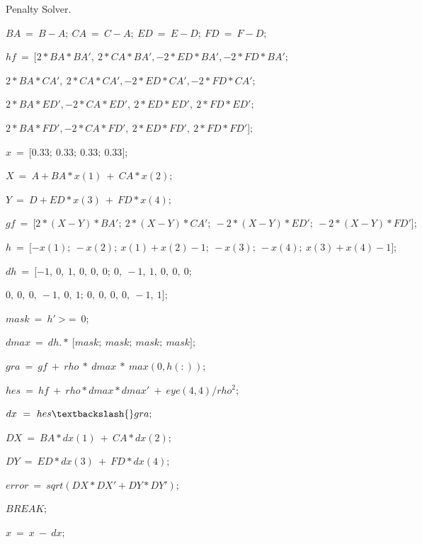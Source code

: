 \begin{algorithm}
	\protect\caption{\label{alg4}Penalty Solver.}
	\begin{algorithmic}[1]
	

		\State $BA~=~B-A;~CA~=~C-A;~ED~=~E-D;~FD~=~F-D;$

		\State $hf~=~{[}2{*}BA{*}BA',~2{*}CA{*}BA',-2{*}ED{*}BA',-2{*}FD{*}BA';$

		\State $2{*}BA{*}CA',~2{*}CA{*}CA',-2{*}ED{*}CA',-2{*}FD{*}CA';$

		\State $2{*}BA{*}ED',-2{*}CA{*}ED',~2{*}ED{*}ED',~2{*}FD{*}ED';$

		\State $2{*}BA{*}FD',-2{*}CA{*}FD',~2{*}ED{*}FD',~2{*}FD{*}FD'{]};$

		\State $x~=~{[}0.33;~0.33;~0.33;~0.33{]};$


			\State $X~=~A+BA{*}x(1)~+~CA{*}x(2);$

			\State $Y~=~D+ED{*}x(3)~+~FD{*}x(4);$

			\State $gf~=~{[}2{*}(X-Y){*}BA';~2{*}(X-Y){*}CA';~-2{*}(X-Y){*}ED';~-2{*}(X-Y){*}FD'{]};$

			\State $h~=~{[}-x(1);~-x(2);~x(1)+x(2)-1;~-x(3);~-x(4);~x(3)+x(4)-1{]};$

			\State $dh~=~{[}-1,~0,~1,~0,~0,~0;~0,~-1,~1,~0,~0,~0;$

			\State $0,~0,~0,~-1,~0,~1;~0,~0,~0,~0,~-1,~1{]};$

			\State $mask~=~h'~$>$=~0;$

			\State $dmax~=~dh.{*}~{[}mask;~mask;~mask;~mask{]};$

			\State $gra~=~gf~+~rho~{*}~dmax~{*}~max(0,h(:));$

			\State $hes~=~hf~+~rho{*}dmax{*}dmax'~+~eye(4,4)/rho^2;$

			\State $dx~=~hes\textbackslash{}gra;$

			\State $DX~=~BA{*}dx(1)~+~CA{*}dx(2);$

			\State $DY~=~ED{*}dx(3)~+~FD{*}dx(4);$

			\State $error~=~sqrt(DX{*}DX'+DY{*}DY');$

				\State $BREAK;$
			\EndIf

			\State $x~=~x~-~dx;$

		\EndFor

	\EndFunction
	\end{algorithmic}

\end{algorithm}


